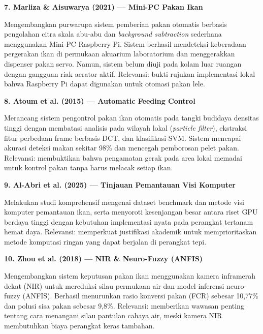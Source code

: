 \documentclass[11pt,a4paper]{article}
\begin{document}
\noindent\textbf{7. Marliza \& Aisuwarya (2021) --- Mini-PC Pakan Ikan}\par
\noindent Mengembangkan purwarupa sistem pemberian pakan otomatis berbasis pengolahan citra skala abu-abu dan \textit{background subtraction} sederhana menggunakan Mini-PC Raspberry Pi. Sistem berhasil mendeteksi keberadaan pergerakan ikan di permukaan akuarium laboratorium dan menggerakkan dispenser pakan servo. Namun, sistem belum diuji pada kolam luar ruangan dengan gangguan riak aerator aktif. Relevansi: bukti rujukan implementasi lokal bahwa Raspberry Pi dapat digunakan untuk otomasi pakan lele.
\vspace{0.7em}

\noindent\textbf{8. Atoum et al. (2015) --- Automatic Feeding Control}\par
\noindent Merancang sistem pengontrol pakan ikan otomatis pada tangki budidaya densitas tinggi dengan membatasi analisis pada wilayah lokal (\textit{particle filter}), ekstraksi fitur perbedaan frame berbasis DCT, dan klasifikasi SVM. Sistem mencapai akurasi deteksi makan sekitar 98\% dan mencegah pemborosan pelet pakan. Relevansi: membuktikan bahwa pengamatan gerak pada area lokal memadai untuk kontrol pakan tanpa harus melacak setiap ikan.
\vspace{0.7em}

\noindent\textbf{9. Al-Abri et al. (2025) --- Tinjauan Pemantauan Visi Komputer}\par
\noindent Melakukan studi komprehensif mengenai dataset benchmark dan metode visi komputer pemantauan ikan, serta menyoroti kesenjangan besar antara riset GPU berdaya tinggi dengan kebutuhan implementasi nyata pada perangkat tertanam hemat daya. Relevansi: memperkuat justifikasi akademik untuk memprioritaskan metode komputasi ringan yang dapat berjalan di perangkat tepi.
\vspace{0.7em}

\noindent\textbf{10. Zhou et al. (2018) --- NIR \& Neuro-Fuzzy (ANFIS)}\par
\noindent Mengembangkan sistem keputusan pakan ikan menggunakan kamera inframerah dekat (NIR) untuk mereduksi silau permukaan air dan model inferensi neuro-fuzzy (ANFIS). Berhasil menurunkan rasio konversi pakan (FCR) sebesar 10,77\% dan polusi sisa pakan sebesar 9,8\%. Relevansi: memberikan wawasan penting tentang cara menangani silau pantulan cahaya air, meski kamera NIR membutuhkan biaya perangkat keras tambahan.
\vspace{0.7em}
\end{document}
